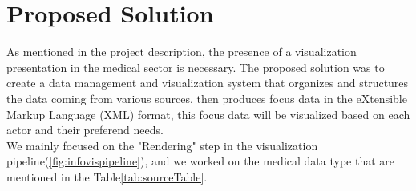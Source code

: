 \section{Proposed Solution}
As mentioned in the project description, the presence of a visualization presentation in the medical sector is necessary. The proposed solution was to create a data management and visualization system that organizes and structures the data coming from various sources, then produces focus data in the eXtensible Markup Language (XML) format, this focus data will be visualized based on each actor and their preferend needs.\\
We mainly focused on the "Rendering" step in the visualization pipeline(\ref{fig:infovispipeline}), and we worked on the medical data type that are mentioned in the Table\ref{tab:sourceTable}.


